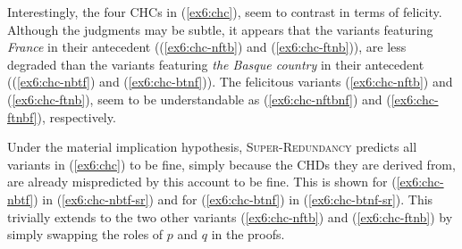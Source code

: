 \begin{exe}
	\ex\label{ex6:chc}
	\begin{xlist}
		\label{ex6:chc-nbtf}
		\label{ex6:chc-nftb}
		\label{ex6:chc-btnf}
		\label{ex6:chc-ftnb}
	\end{xlist}
\end{exe} 


Interestingly, the four CHCs in (\ref{ex6:chc}), seem to contrast in terms of felicity. Although the judgments may be subtle, it appears that the variants featuring \textit{France} in their antecedent ((\ref{ex6:chc-nftb}) and (\ref{ex6:chc-ftnb})), are less degraded than the variants featuring \textit{the Basque country} in their antecedent ((\ref{ex6:chc-nbtf}) and (\ref{ex6:chc-btnf})). The felicitous variants (\ref{ex6:chc-nftb}) and (\ref{ex6:chc-ftnb}), seem to be understandable as (\ref{ex6:chc-nftbnf}) and (\ref{ex6:chc-ftnbf}), respectively.


\begin{exe}
	\ex
	\begin{xlist}
		\label{ex6:chc-nftbnf}
		\label{ex6:chc-ftnbf}
	\end{xlist}
\end{exe}

Under the material implication hypothesis, \textsc{Super-Redundancy} predicts all variants in (\ref{ex6:chc}) to be fine, simply because the CHDs they are derived from, are already mispredicted by this account to be fine. This is shown for (\ref{ex6:chc-nbtf}) in (\ref{ex6:chc-nbtf-sr}) and for (\ref{ex6:chc-btnf}) in (\ref{ex6:chc-btnf-sr}). This trivially extends to the two other variants (\ref{ex6:chc-nftb}) and (\ref{ex6:chc-ftnb}) by simply swapping the roles of $p$ and $q$ in the proofs.\\

